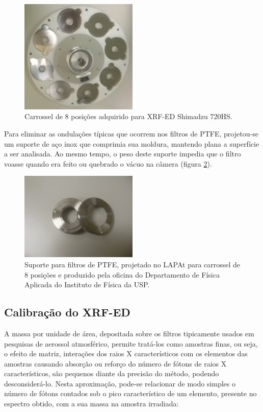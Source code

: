 \begin{figure}[H]
  \centering
  \includegraphics[width=0.5\textwidth]{../inputs/images/carrossel8.jpg}
  \caption{Carrossel de 8 posições adquirido para XRF-ED Shimadzu 720HS. 
           \label{fig:carrossel8}}
\end{figure}

Para eliminar as ondulações típicas que ocorrem nos filtros de PTFE, 
projetou-se um suporte de aço inox que comprimia sua moldura, mantendo plana 
a superfície a ser analisada. Ao mesmo tempo, o peso deste suporte impedia que 
o filtro voasse quando era feito ou quebrado o vácuo na câmera 
(figura \ref{fig:suporte8}).

\begin{figure}[H]
  \centering
  \includegraphics[width=0.5\textwidth]{../inputs/images/suporte8.jpg}
  \caption{Suporte para filtros de PTFE, projetado no LAPAt para carrossel de 
           8 posições e produzido pela oficina do Departamento de Física Aplicada do 
           Instituto de Física da USP. \label{fig:suporte8}}
\end{figure}

\subsection{Calibração do XRF-ED}

A massa por unidade de área, depositada sobre os filtros tipicamente usados em 
pesquisas de aerossol atmosférico, permite tratá-los como amostras finas,
ou seja, o efeito de matriz, interações dos raios X característicos com os 
elementos das amostras causando absorção ou reforço do número de fótons de 
raios X característicos, são pequenos diante da precisão do método,
podendo desconsiderá-lo. Nesta aproximação, pode-se relacionar de modo 
simples o número de fótons contados sob o pico característico de um elemento, 
presente no espectro obtido, com a sua massa na amostra irradiada:

